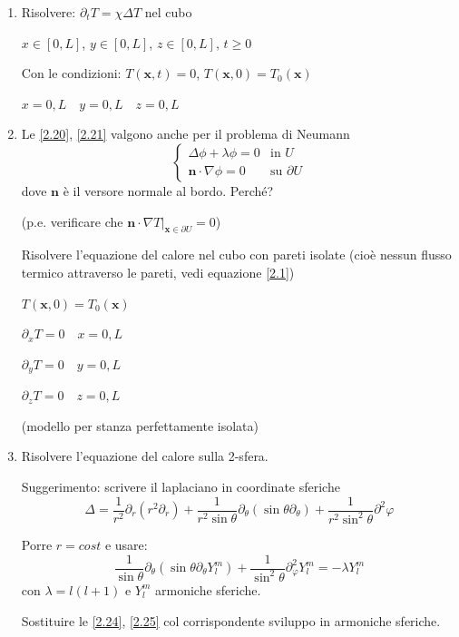 \documentclass[a4paper,11pt]{report}
\newcommand{\vect}[1]{\boldsymbol{#1}}
\newcommand{\x}{\boldsymbol{x}}
\begin{document}
\begin{enumerate}[label=(\roman*)]

\item Risolvere: $\partial_t T=\chi\Delta T$ nel cubo

$x\in[0,L]$, $y\in[0,L]$, $z\in[0,L]$, $t\geq 0$

Con le condizioni: $T(\x,t)=0$, $T(\x,0)=T_0(\x)$

$x=0,L \quad y=0,L \quad z=0,L $

\item Le \eqref{2.20}, \eqref{2.21} valgono anche per il problema di Neumann 
\[
\begin{cases}
\Delta\phi + \lambda\phi =0 & \text{in }U\\
\vect{n}\cdot \nabla\phi=0 & \text{su }\partial U
\end{cases}
\]
dove $\vect{n}$ \`e il versore normale al bordo. Perch\'e? 

(p.e. verificare che $\vect{n}\cdot\nabla T\big|_{\x\in \partial U}=0$)

Risolvere l'equazione del calore nel cubo con pareti isolate (cio\`e nessun flusso termico attraverso le pareti, vedi equazione \eqref{2.1})

$T(\x,0)=T_0(\x)$

$\partial_x T=0 \quad x=0,L$

$\partial_y T=0 \quad y=0,L$

$\partial_z T=0 \quad z=0,L$

(modello per stanza perfettamente isolata)

\item Risolvere l'equazione del calore sulla 2-sfera. 
 
Suggerimento: scrivere il laplaciano in coordinate sferiche
\begin{equation}
\Delta =\frac{1}{r^2}\partial_r(r^2\partial_r)+\frac{1}{r^2\sin\theta}\partial_{\theta} (\sin\theta\partial_{\theta})+\frac{1}{r^2\sin^2\theta}\partial^2\varphi
\end{equation}

Porre $r=cost$ e usare:
\begin{equation}
\frac{1}{\sin\theta}\partial_{\theta}(\sin\theta\partial_\theta Y^m_l)+\frac{1}{\sin^2\theta}\partial^2_{\varphi}Y_l^m=-\lambda Y_l^m
\end{equation}
con $\lambda=l(l+1)$ e $Y_l^m$ armoniche sferiche. 

Sostituire le \eqref{2.24}, \eqref{2.25} col corrispondente sviluppo in armoniche sferiche.
\end{enumerate}
\end{document}
